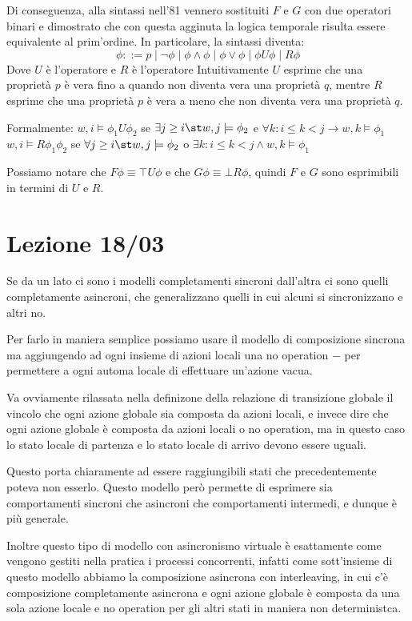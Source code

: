 Di conseguenza, alla sintassi nell'81 vennero sostituiti \(F\) e \(G\) con due operatori binari e dimostrato che con questa agginuta la logica temporale risulta essere equivalente al prim'ordine.
In particolare, la sintassi diventa:
\[\phi ::= p \mid \neg \phi \mid \phi \land \phi \mid \phi \lor \phi \mid \phi U \phi \mid R\phi\]
Dove \(U\) è l'operatore  e \(R\) è l'operatore 
Intuitivamente \(U\) esprime che una proprietà \(p\) è vera fino a quando non diventa vera una proprietà \(q\), mentre \(R\) esprime che una proprietà \(p\) è vera a meno che non diventa vera una proprietà \(q\).

Formalmente:
\(w,i \models \phi_1 U \phi_2\) se \(\exists j \geq i \st w,j\models \phi_2\) e \(\forall k: i \leq k < j \to w,k\models \phi_1\)
\(w,i \models R\phi_1 \phi_2\) se \(\forall j \geq i \st w,j\models \phi_2\) o \(\exists k: i \leq k < j \land w,k\models \phi_1\)

Possiamo notare che \(F\phi \equiv \top U \phi\) e che \(G\phi \equiv \bot R \phi\), quindi \(F\) e \(G\) sono esprimibili in termini di \(U\) e \(R\).

\chapter{Lezione 18/03}

Se da un lato ci sono i modelli completamenti sincroni dall'altra ci sono quelli completamente asincroni, che generalizzano quelli in cui alcuni si sincronizzano e altri no.

Per farlo in maniera semplice possiamo usare il modello di composizione sincrona ma aggiungendo ad ogni insieme di azioni locali una no operation \(-\) per permettere a ogni automa locale di effettuare un'azione vacua.

Va ovviamente rilassata nella definizone della relazione di transizione globale il vincolo che ogni azione globale sia composta da azioni locali, e invece dire che ogni azione globale è composta da azioni locali o no operation, ma in questo caso lo stato locale di partenza e lo stato locale di arrivo devono essere uguali.

Questo porta chiaramente ad essere raggiungibili stati che precedentemente poteva non esserlo. Questo modello però permette di esprimere sia comportamenti sincroni che asincroni che comportamenti intermedi, e dunque è più generale.

Inoltre questo tipo di modello con asincronismo virtuale è esattamente come vengono gestiti nella pratica i processi concorrenti, infatti come sott'insieme di questo modello abbiamo la composizione asincrona con interleaving, in cui c'è composizione completamente asincrona e ogni azione globale è composta da una sola azione locale e no operation per gli altri stati in maniera non deterministca.

